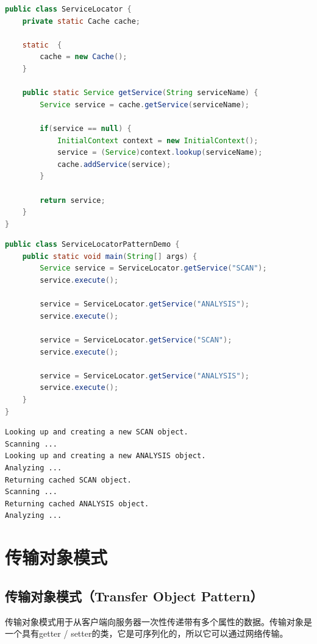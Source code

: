 \begin{lstlisting}[language=Java, title=ServiceLocator.java]
public class ServiceLocator {
	private static Cache cache;

	static  {
		cache = new Cache();
	}

	public static Service getService(String serviceName) {
		Service service = cache.getService(serviceName);

		if(service == null) {
			InitialContext context = new InitialContext();
			service = (Service)context.lookup(serviceName);
			cache.addService(service);
		}

		return service;
	}
}
\end{lstlisting}

\begin{lstlisting}[language=Java, title=ServiceLocatorPatternDemo.java]
public class ServiceLocatorPatternDemo {
	public static void main(String[] args) {
		Service service = ServiceLocator.getService("SCAN");
		service.execute();

		service = ServiceLocator.getService("ANALYSIS");
		service.execute();

		service = ServiceLocator.getService("SCAN");
		service.execute();

		service = ServiceLocator.getService("ANALYSIS");
		service.execute();
	}
}	
\end{lstlisting}

\begin{tcolorbox}
    \begin{verbatim}
Looking up and creating a new SCAN object.
Scanning ...
Looking up and creating a new ANALYSIS object.
Analyzing ...
Returning cached SCAN object.
Scanning ...
Returning cached ANALYSIS object.
Analyzing ...
\end{verbatim}
\end{tcolorbox}

\newpage

\section{传输对象模式}

\subsection{传输对象模式（Transfer Object Pattern）}

传输对象模式用于从客户端向服务器一次性传递带有多个属性的数据。传输对象是一个具有getter / setter的类，它是可序列化的，所以它可以通过网络传输。\\

